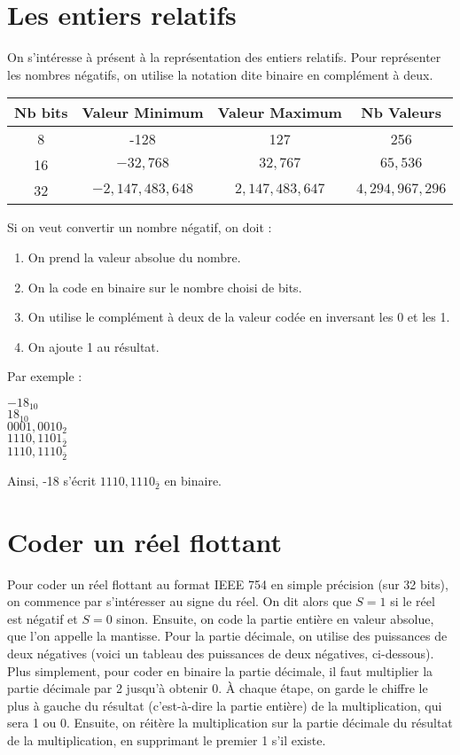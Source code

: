 \documentclass{article}
\begin{document}
	\section{Les entiers relatifs}
		On s'intéresse à présent à la représentation des entiers relatifs. Pour représenter les nombres négatifs, on utilise la notation dite binaire en complément à deux.
	
		\begin{center}
			\begin{tabular}{ | c | c | c | c | }
  				\hline
  					Nb bits & Valeur Minimum & Valeur Maximum & Nb Valeurs \\
				\hline
					8 & -128 & 127 & 256 \\
				\hline
					16 & $-32,768$ & $32,767$ & $65,536$ \\
				\hline
					32 & $-2,147,483,648$ & $2,147,483,647$ & $4,294,967,296$ \\
				\hline
			\end{tabular}
		\end{center}
		
		Si on veut convertir un nombre négatif, on doit :
		\begin{enumerate}
			\item On prend la valeur absolue du nombre.
			\item On la code en binaire sur le nombre choisi de bits.
			\item On utilise le complément à deux de la valeur codée en inversant les 0 et les 1.
			\item On ajoute 1 au résultat.
		\end{enumerate}
		
		Par exemple :

		\begin{center}
			$-18_{10}$ \\
			$18_{10}$ \\
			$0001,0010_2$ \\
			$1110,1101_{\bar2}$ \\
			$1110,1110_{\bar2}$ \\			
		\end{center}

		Ainsi, -18 s'écrit $1110,1110_{\bar2}$ en binaire.
	
	\section{Coder un réel flottant}
		Pour coder un réel flottant au format IEEE 754 en simple précision (sur 32 bits), on commence par s'intéresser au signe du réel. On dit alors que $S = 1$ si le réel est négatif et $S = 0$ sinon. Ensuite, on code la partie entière en valeur absolue, que l'on appelle la mantisse. Pour la partie décimale, on utilise des puissances de deux négatives (voici un tableau des puissances de deux négatives, ci-dessous). Plus simplement, pour coder en binaire la partie décimale, il faut multiplier la partie décimale par 2 jusqu'à obtenir 0. À chaque étape, on garde le chiffre le plus à gauche du résultat (c'est-à-dire la partie entière) de la multiplication, qui sera 1 ou 0. Ensuite, on réitère la multiplication sur la partie décimale du résultat de la multiplication, en supprimant le premier 1 s'il existe.
		
\end{document}
